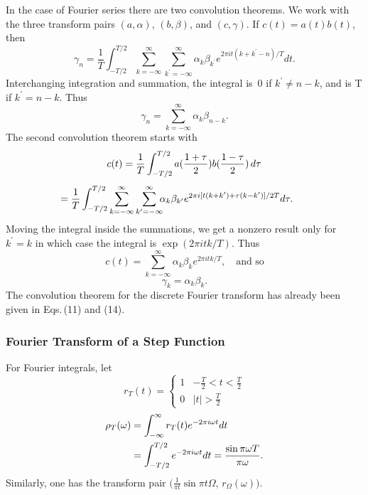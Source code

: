 \documentclass[twoside]{MATH77}
\begin{document}
In the case of Fourier series there are two convolution theorems. We
work with the three transform pairs $(a,\alpha )$, $(b,\beta )$, and
$(c,\gamma )$. If $c(t)=a(t)b(t)$, then
\begin{equation}\label{O27}
\gamma _n=\frac 1T\int_{-T/2}^{T/2}\sum_{k=-\infty }^\infty
\sum_{k^{\prime }=-\infty }^\infty \alpha _k\beta _{k^{\prime }}e^{2\pi
it(k+k^{\prime }-n)/T}dt.
\end{equation}
Interchanging integration and summation, the integral is~0 if $k^{\prime
}\neq n-k$, and is T if $k^{\prime }=n-k$. Thus
\begin{equation}\label{O28}
\gamma _n=\sum_{k=-\infty }^\infty \alpha _k\beta _{n-k}.
\end{equation}
The second convolution theorem starts with
\begin{multline}\label{O29}
c(t)=\frac 1T\int_{-T/2}^{T/2}a(\frac{1+\tau }2)b(\frac{1-\tau
}2)\,d\tau \vspace{4pt} \\
\hspace{-15pt}=\frac 1T\int_{-T/2}^{T/2}
\sum_{k=-\infty }^\infty \sum_{k^{\prime }=-\infty
}^\infty \!\!\!\alpha _k\beta _{k^{\prime }}e^{2\pi i[t(k+k^{\prime })+\tau
(k-k^{\prime })]/2T}d\tau .
\end{multline}
Moving the integral inside the summations, we get a nonzero result only
for $k^{\prime }=k$ in which case the integral is $\exp (2\pi itk/T)$.
Thus%
\begin{equation*}
c(t)=\sum_{k=-\infty }^\infty \alpha _k\beta _ke^{2\pi itk/T},\quad
\text{and so}
\end{equation*}
\begin{equation}\label{O30}
\gamma _k=\alpha _k\beta _k.
\end{equation}
The convolution theorem for the discrete Fourier transform has already been
given in Eqs.\,(11) and (14).

\subsubsection{Fourier Transform of a Step Function}

For Fourier integrals, let
\begin{equation}\label{O31}
r_T(t)=
\begin{cases}
1 & -\frac T2<t<\frac T2\\
0 & |t|>\frac T2
\end{cases}
\end{equation}
\begin{equation}\label{O32}
\begin{split}
\rho _T(\omega )&=\int_{-\infty }^\infty r_T(t)e^{-2\pi i\omega
t}dt\vspace{4pt} \\
\phantom{\rho _T(\omega )}&=\int_{-T/2}^{T/2}e^{-2\pi i\omega t}dt=
\frac{\sin \pi \omega T}{\pi \omega }.
\end{split}
\end{equation}
Similarly, one has the transform pair $(\frac 1{\pi t}\sin \pi t\Omega $, $r_\Omega
(\omega )).$
\end{document}
